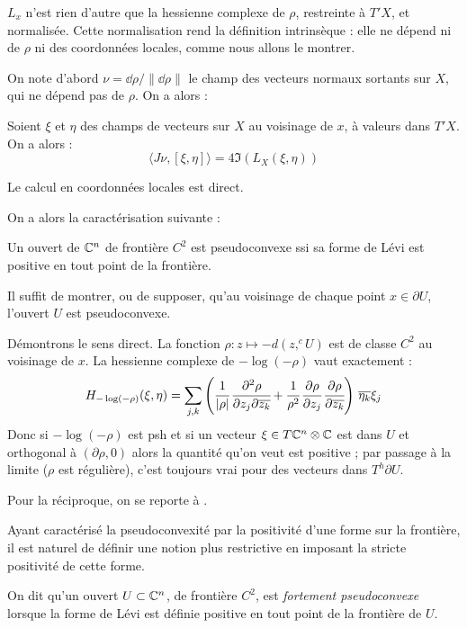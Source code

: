 $L_x$ n'est rien d'autre que la hessienne complexe de $\rho$, restreinte à $T'X$, et normalisée. Cette normalisation rend la définition intrinsèque : elle ne dépend ni de $\rho$ ni des coordonnées locales, comme nous allons le montrer.

On note d'abord $\nu = \dd \rho/\|\dd \rho\|$ le champ des vecteurs normaux sortants sur $X$, qui ne dépend pas de $\rho$. On a alors :

\begin{prop}\label{prop:Levi-invariant}
	Soient $\xi$ et $\eta$ des champs de vecteurs sur $X$ au voisinage de $x$, à valeurs dans $T'X$. On a alors :
	\begin{equation*}
		\langle J\nu,[\xi,\eta]\rangle =4\Im(L_X(\xi,\eta))
	\end{equation*}
\end{prop}
\begin{preuve}
	Le calcul en coordonnées locales est direct.
\end{preuve}
On a alors la caractérisation suivante :
\begin{prop}
	Un ouvert de $\mathbb{C}^n$ de frontière $C^2$ est pseudoconvexe ssi sa forme de Lévi est positive en tout point de la frontière.
\end{prop}
\begin{preuve}
Il suffit de montrer, ou de supposer, qu'au voisinage de chaque point $x \in \partial U$, l'ouvert $U$ est pseudoconvexe.

Démontrons le sens direct. La fonction $\rho:z \mapsto -d(z,^cU)$ est de classe $C^2$ au voisinage de $x$. La hessienne complexe de $-\log(-\rho)$ vaut exactement :
\begin{equation*}
H_{-\log(-\rho)}(\xi,\eta)=\sum_{j,k}\left(\cfrac{1}{|\rho|}\,\cfrac{\partial^2\rho}{\partial z_j\partial \overline{z_k}} + \cfrac{1}{\rho^2}\,\cfrac{\partial \rho}{\partial z_j}\,\cfrac{\partial \rho}{\partial \overline{z_k}}\right)\,\overline{\eta_k}\xi_j
\end{equation*}
Donc si $-\log(-\rho)$ est psh et si un vecteur $\xi \in T\mathbb{C}^n \otimes \mathbb{C}$ est dans $U$ et orthogonal à $(\partial \rho,0)$ alors la quantité qu'on veut est positive ; par passage à la limite ($\rho$ est régulière), c'est toujours vrai pour des vecteurs dans $T^h\partial U$.

Pour la réciproque, on se reporte à \cite{demailly1997complex}.
\end{preuve}

Ayant caractérisé la pseudoconvexité par la positivité d'une forme sur la frontière, il est naturel de définir une notion plus restrictive en imposant la stricte positivité de cette forme.
\begin{defn}
On dit qu'un ouvert $U \subset \mathbb{C}^n$, de frontière $C^2$, est \emph{fortement pseudoconvexe} lorsque la forme de Lévi est définie positive en tout point de la frontière de $U$.
\end{defn}
